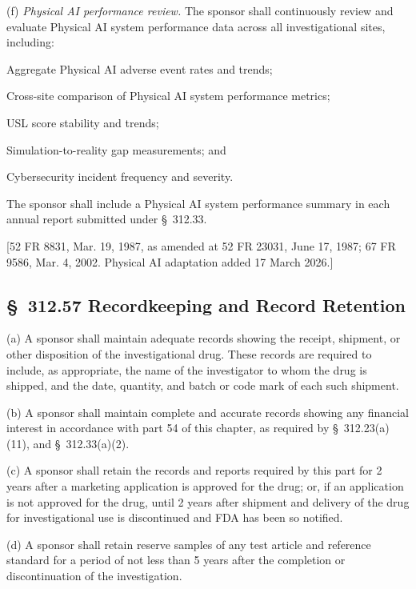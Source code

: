 (f) \textit{Physical AI performance review.} The sponsor shall continuously review and evaluate Physical AI system performance data across all investigational sites, including:

\begin{description}[leftmargin=0.8cm,style=sameline]
\item[(i)] Aggregate Physical AI adverse event rates and trends;
\item[(ii)] Cross-site comparison of Physical AI system performance metrics;
\item[(iii)] USL score stability and trends;
\item[(iv)] Simulation-to-reality gap measurements; and
\item[(v)] Cybersecurity incident frequency and severity.
\end{description}

The sponsor shall include a Physical AI system performance summary in each annual report submitted under \S~312.33.

[52 FR 8831, Mar. 19, 1987, as amended at 52 FR 23031, June 17, 1987; 67 FR 9586, Mar. 4, 2002. Physical AI adaptation added 17 March 2026.]

\subsection{\S~312.57 Recordkeeping and Record Retention}

(a) A sponsor shall maintain adequate records showing the receipt, shipment, or other disposition of the investigational drug. These records are required to include, as appropriate, the name of the investigator to whom the drug is shipped, and the date, quantity, and batch or code mark of each such shipment.

(b) A sponsor shall maintain complete and accurate records showing any financial interest in accordance with part 54 of this chapter, as required by \S~312.23(a)(11), and \S~312.33(a)(2).

(c) A sponsor shall retain the records and reports required by this part for 2 years after a marketing application is approved for the drug; or, if an application is not approved for the drug, until 2 years after shipment and delivery of the drug for investigational use is discontinued and FDA has been so notified.

(d) A sponsor shall retain reserve samples of any test article and reference standard for a period of not less than 5 years after the completion or discontinuation of the investigation.


